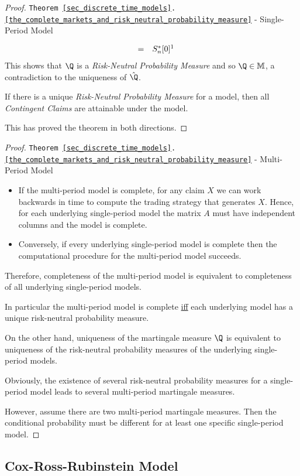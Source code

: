 \documentclass[11pt,a4paper]{article}
\begin{document}
\begin{proof}{\texttt{Theorem \ref{sec_discrete_time_models}.\ref{the_complete_markets_and_risk_neutral_probability_measure}} - Single-Period Model}
\begin{itemize}
\[\begin{array}{rcl}
        &=&S_n^*[0]\footnotemark
      \end{array}\]
      This shows that $\Q$ is a \textit{Risk-Neutral Probability Measure} and so $\Q\in\mathbb{M}$, a contradiction to the uniqueness of $\hat\Q$.
      \par If there is a unique \textit{Risk-Neutral Probability Measure} for a model, then all \textit{Contingent Claims} are attainable under the model.
    \end{itemize}
    This has proved the theorem in both directions.\proved
  \end{proof}

  \begin{proof}{\texttt{Theorem \ref{sec_discrete_time_models}.\ref{the_complete_markets_and_risk_neutral_probability_measure}} - Multi-Period Model}
    \begin{itemize}
      \item If the multi-period model is complete, for any claim $X$ we can work backwards in time to compute the trading strategy that generates $X$. Hence, for each underlying single-period model the matrix $A$ must have independent columns and the model is complete.
      \item Conversely, if every underlying single-period model is complete then the computational procedure for the multi-period model succeeds.
    \end{itemize}
    Therefore, completeness of the multi-period model is equivalent to completeness of all underlying single-period models.
    \par In particular the multi-period model is complete \underline{iff} each underlying model has a unique risk-neutral probability measure.
    \par On the other hand, uniqueness of the martingale measure $\Q$ is equivalent to uniqueness of the risk-neutral probability measures of the underlying single-period models.
    \par Obviously, the existence of several risk-neutral probability measures for a single-period model leads to several multi-period martingale measures.
    \par However, assume there are two multi-period martingale measures. Then the conditional probability must be different for at least one specific single-period model.\proved
  \end{proof}

\subsection{Cox-Ross-Rubinstein Model}
\end{document}
